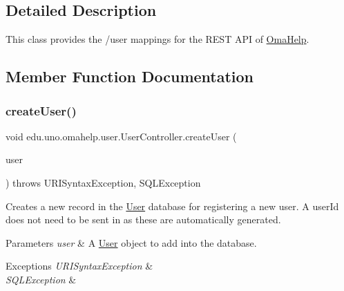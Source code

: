 \subsection{Detailed Description}
This class provides the /user mappings for the R\+E\+ST A\+PI of \mbox{\hyperlink{classedu_1_1uno_1_1omahelp_1_1_oma_help}{Oma\+Help}}. 

\subsection{Member Function Documentation}
\mbox{\label{classedu_1_1uno_1_1omahelp_1_1user_1_1_user_controller_a7167a8f081b5f02f891ec356779c01ae}} 
\subsubsection{\texorpdfstring{create\+User()}{createUser()}}
{\footnotesize\ttfamily void edu.\+uno.\+omahelp.\+user.\+User\+Controller.\+create\+User (\begin{DoxyParamCaption}\item[{@Request\+Body \mbox{\hyperlink{classedu_1_1uno_1_1omahelp_1_1user_1_1_user}{User}}}]{user }\end{DoxyParamCaption}) throws U\+R\+I\+Syntax\+Exception, S\+Q\+L\+Exception}

Creates a new record in the \mbox{\hyperlink{classedu_1_1uno_1_1omahelp_1_1user_1_1_user}{User}} database for registering a new user. A user\+Id does not need to be sent in as these are automatically generated.


\begin{DoxyParams}{Parameters}
{\em user} & A \mbox{\hyperlink{classedu_1_1uno_1_1omahelp_1_1user_1_1_user}{User}} object to add into the database. \\
\hline
\end{DoxyParams}

\begin{DoxyExceptions}{Exceptions}
{\em U\+R\+I\+Syntax\+Exception} & \\
\hline
{\em S\+Q\+L\+Exception} & \\
\hline
\end{DoxyExceptions}
\mbox{\label{classedu_1_1uno_1_1omahelp_1_1user_1_1_user_controller_a5ca080d27acf3359a338994e3bdaf5b6}} 
